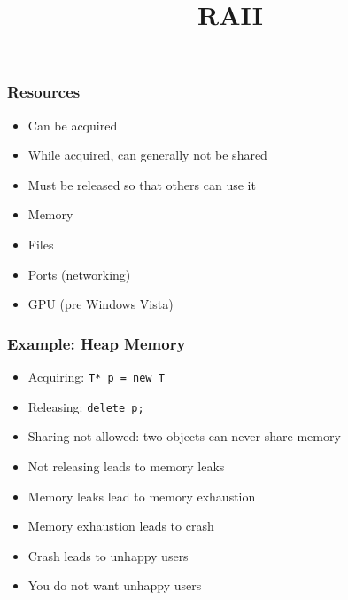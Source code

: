 

\usetikzlibrary{shadows,shapes.multipart}

\title{RAII}



\lstset{language=c++14}



\begin{frame}
  \titlepage
\end{frame}

\begin{frame}
  \frametitle{Resources}
  \begin{itemize}
    \item Can be acquired
    \item While acquired, can generally not be shared
    \item Must be released so that others can use it
  \end{itemize}
  \vskip5mm
  \begin{itemize}
    \item Memory
    \item Files
    \item Ports (networking)
    \item GPU (pre Windows Vista)
  \end{itemize}
\end{frame}

\begin{frame}
  \frametitle{Example: Heap Memory}
  \begin{itemize}
    \item Acquiring: {\tt T* p = new T}
    \item Releasing: {\tt delete p;}
    \item Sharing not allowed: two objects can never share memory
    \item Not releasing leads to memory leaks
    \item Memory leaks lead to memory exhaustion
    \item Memory exhaustion leads to crash
    \item Crash leads to unhappy users
    \item You do not want unhappy users
  \end{itemize}
\end{frame}

